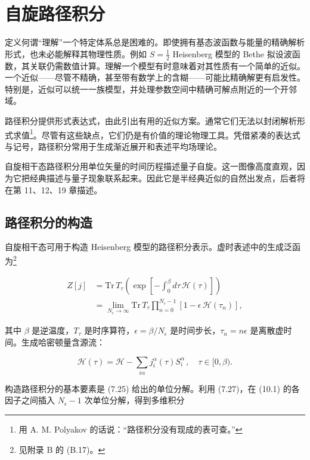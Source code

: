\chapter{自旋路径积分}

定义何谓“理解”一个特定体系总是困难的。即使拥有基态波函数与能量的精确解析形式，也未必能解释其物理性质。例如 $S = \frac{1}{2}$ Heisenberg 模型的 Bethe 拟设波函数，其关联仍需数值计算。理解一个模型有时意味着对其性质有一个简单的近似。一个近似——尽管不精确，甚至带有数学上的含糊——可能比精确解更有启发性。特别是，近似可以统一一族模型，并处理参数空间中精确可解点附近的一个开邻域。

路径积分提供形式表达式，由此引出有用的近似方案。通常它们无法以封闭解析形式求值\footnote{用 A. M. Polyakov 的话说：“路径积分没有现成的表可查。”}。尽管有这些缺点，它们仍是有价值的理论物理工具。凭借紧凑的表达式与记号，路径积分常用于生成渐近展开和表述平均场理论。

自旋相干态路径积分用单位矢量的时间历程描述量子自旋。这一图像高度直观，因为它把经典描述与量子现象联系起来。因此它是半经典近似的自然出发点，后者将在第 11、12、19 章描述。

\section{路径积分的构造}

自旋相干态可用于构造 Heisenberg 模型的路径积分表示。虚时表述中的生成泛函为\footnote{见附录 B 的 (B.17)。}

\begin{align*}
Z [ j ] & = \mathrm{Tr} \, T _ {\tau} \left( \exp \left[ - \int_ {0} ^ {\beta} d \tau \, \mathcal {H} ( \tau ) \right] \right)\\
& = \lim _ {N _ {\epsilon} \to \infty} \mathrm{Tr} \, T _ {\tau} \prod_ {n = 0} ^ {N _ {\epsilon} - 1} \left[ 1 - \epsilon \, \mathcal {H} ( \tau _ {n} ) \right] ,
\tag{10.1}
\end{align*}

其中 $\beta$ 是逆温度，$T_{\tau}$ 是时序算符，$\epsilon = \beta/N_{\epsilon}$ 是时间步长，$\tau_{n} = n\epsilon$ 是离散虚时间。生成哈密顿量含源流：

\begin{equation*}
\mathcal {H} ( \tau ) = \mathcal {H} - \sum_ {i \alpha} j _ {i} ^ {\alpha} ( \tau ) S _ {i} ^ {\alpha} \, , \quad \tau \in [ 0, \beta ) .
\tag{10.2}
\end{equation*}

构造路径积分的基本要素是 (7.25) 给出的单位分解。利用 (7.27)，在 (10.1) 的各因子之间插入 $N_{\epsilon}-1$ 次单位分解，得到多维积分

